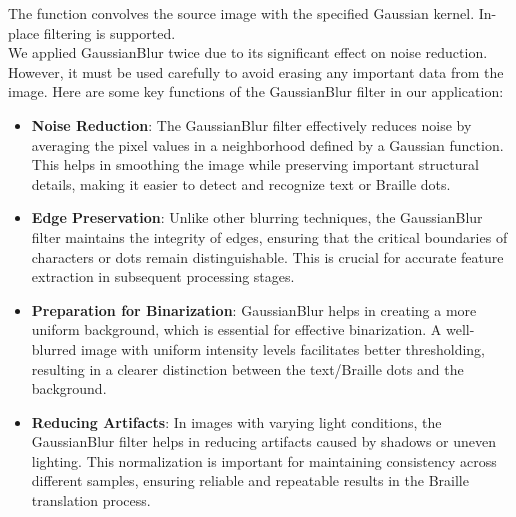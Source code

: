 \quad The function convolves the source image with the specified Gaussian
kernel. In-place filtering is supported.\\

\quad We applied GaussianBlur twice due to its significant effect on noise
reduction. However, it must be used carefully to avoid erasing any
important data from the image. Here are some key functions of the
GaussianBlur filter in our application:\\

\begin{itemize}
\item
  \textbf{Noise Reduction}: The GaussianBlur filter effectively reduces
  noise by averaging the pixel values in a neighborhood defined by a
  Gaussian function. This helps in smoothing the image while preserving
  important structural details, making it easier to detect and recognize
  text or Braille dots.
\item
  \textbf{Edge Preservation}: Unlike other blurring techniques, the
  GaussianBlur filter maintains the integrity of edges, ensuring that
  the critical boundaries of characters or dots remain distinguishable.
  This is crucial for accurate feature extraction in subsequent
  processing stages.
\item
  \textbf{Preparation for Binarization}: GaussianBlur helps in creating
  a more uniform background, which is essential for effective
  binarization. A well-blurred image with uniform intensity levels
  facilitates better thresholding, resulting in a clearer distinction
  between the text/Braille dots and the background.
\item
  \textbf{Reducing Artifacts}: In images with varying light conditions,
  the GaussianBlur filter helps in reducing artifacts caused by shadows
  or uneven lighting. This normalization is important for maintaining
  consistency across different samples, ensuring reliable and repeatable
  results in the Braille translation process.
\end{itemize}\\
